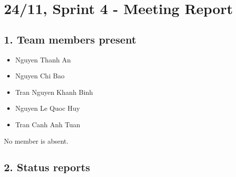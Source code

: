 \documentclass[12pt]{article}
\begin{document}

\section{24/11, Sprint 4 - Meeting Report}

\subsection{1. Team members present}

\begin{itemize}

\item Nguyen Thanh An

\item Nguyen Chi Bao

\item Tran Nguyen Khanh Binh

\item Nguyen Le Quoc Huy

\item Tran Canh Anh Tuan

\end{itemize}

No member is absent.

\subsection{2. Status reports}
\end{document}
